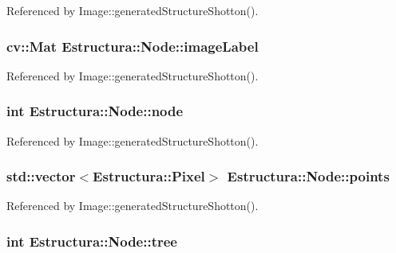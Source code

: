 Referenced by Image\+::generated\+Structure\+Shotton().

\subsubsection[{\texorpdfstring{image\+Label}{imageLabel}}]{\setlength{\rightskip}{0pt plus 5cm}cv\+::\+Mat Estructura\+::\+Node\+::image\+Label}\hypertarget{structEstructura_1_1Node_a7905c0696cb214e84ac855e7a6b6366c}{}\label{structEstructura_1_1Node_a7905c0696cb214e84ac855e7a6b6366c}


Referenced by Image\+::generated\+Structure\+Shotton().

\subsubsection[{\texorpdfstring{node}{node}}]{\setlength{\rightskip}{0pt plus 5cm}int Estructura\+::\+Node\+::node}\hypertarget{structEstructura_1_1Node_a2e360ae2439d4d82dd38d9b30358feac}{}\label{structEstructura_1_1Node_a2e360ae2439d4d82dd38d9b30358feac}


Referenced by Image\+::generated\+Structure\+Shotton().

\subsubsection[{\texorpdfstring{points}{points}}]{\setlength{\rightskip}{0pt plus 5cm}std\+::vector$<${\bf Estructura\+::\+Pixel}$>$ Estructura\+::\+Node\+::points}\hypertarget{structEstructura_1_1Node_a0ad44a6cbbffdcd39f26733cc0e6f196}{}\label{structEstructura_1_1Node_a0ad44a6cbbffdcd39f26733cc0e6f196}


Referenced by Image\+::generated\+Structure\+Shotton().

\subsubsection[{\texorpdfstring{tree}{tree}}]{\setlength{\rightskip}{0pt plus 5cm}int Estructura\+::\+Node\+::tree}\hypertarget{structEstructura_1_1Node_abb400b36a5e8179766c35bc73c22e816}{}\label{structEstructura_1_1Node_abb400b36a5e8179766c35bc73c22e816}


